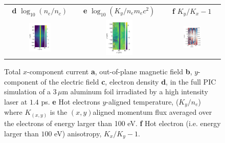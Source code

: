 \documentclass[aps,showpacs,superscriptaddress]{revtex4}
\begin{document}
\begin{figure}
{\begin{tabular}{ccc}
 \textbf{d} $\log_{10}(n_e/n_c)$ &\textbf{e} $\log_{10}(K_y/n_em_ec^2)$&\textbf{f} $K_y/K_x-1$ \\
 \includegraphics[width=0.33\textwidth]{ne_t104000_nat.png} 
 &\includegraphics[width=0.33\textwidth]{Ty_t104000_nat.png} 
 &\includegraphics[width=0.33\textwidth]{a_t104000_nat.png} 
\end{tabular}} 
\caption{\label{fig:PIC_las} 
Total $x$-component current \textbf{a}, out-of-plane magnetic field \textbf{b}, $y$-component of the electric field \textbf{c}, electron density \textbf{d},  in the full PIC simulation of a $3\, \mu$m aluminum foil irradiated by a high intensity laser at $1.4$ ps.
\textbf{e} Hot electrons  $y$-aligned temperature, ($K_y/ n_e$) where $K_{(x,y)}$ is the $(x,y)$aligned momentum flux  averaged over the electrons of energy larger than 100 eV.
\textbf{f} Hot electron (i.e. energy larger than $100$ eV) anisotropy, $K_x/K_y -1$.
}
\end{figure}
\end{document}
